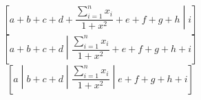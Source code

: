 \documentclass{article}
\begin{document}
\[\left[a+b+c+d+\frac{\sum_{i=1}^n x_i}{1+x^2}+e+f+g+h\middle|i\right]\]
\[\left[a+b+c+d\middle|\frac{\sum_{i=1}^n x_i}{1+x^2}+e+f+g+h+i\right]\]
\[\left[a\middle|b+c+d\middle|\frac{\sum_{i=1}^n x_i}{1+x^2}\middle|e+f+g+h+i\right]\]
\end{document}
